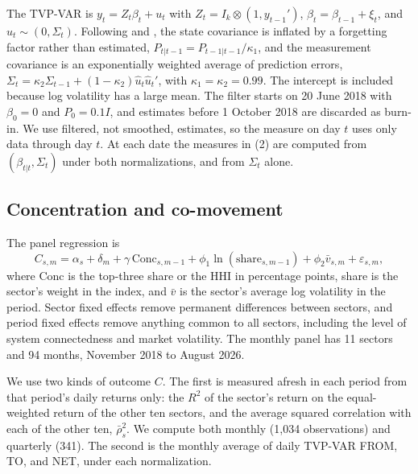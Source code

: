 \documentclass[11pt]{article}
\begin{document}
The TVP-VAR is $y_t = Z_t\beta_t + u_t$ with $Z_t = I_k\otimes(1, y_{t-1}')$, $\beta_t = \beta_{t-1}+\xi_t$, and $u_t\sim(0,\Sigma_t)$. Following \citet{koop2013} and \citet{antonakakis2020}, the state covariance is inflated by a forgetting factor rather than estimated, $P_{t|t-1} = P_{t-1|t-1}/\kappa_1$, and the measurement covariance is an exponentially weighted average of prediction errors, $\Sigma_t = \kappa_2\Sigma_{t-1}+(1-\kappa_2)\hat u_t\hat u_t'$, with $\kappa_1=\kappa_2=0.99$. The intercept is included because log volatility has a large mean. The filter starts on 20 June 2018 with $\beta_0=0$ and $P_0 = 0.1I$, and estimates before 1 October 2018 are discarded as burn-in. We use filtered, not smoothed, estimates, so the measure on day $t$ uses only data through day $t$. At each date the measures in (2) are computed from $(\beta_{t|t},\Sigma_t)$ under both normalizations, and from $\Sigma_t$ alone.

\subsection{Concentration and co-movement}

The panel regression is
\begin{equation}
C_{s,m} = \alpha_s + \delta_m + \gamma\,\text{Conc}_{s,m-1} + \phi_1\ln(\text{share}_{s,m-1}) + \phi_2 \bar v_{s,m} + \varepsilon_{s,m},
\end{equation}
where Conc is the top-three share or the HHI in percentage points, share is the sector's weight in the index, and $\bar v$ is the sector's average log volatility in the period. Sector fixed effects remove permanent differences between sectors, and period fixed effects remove anything common to all sectors, including the level of system connectedness and market volatility. The monthly panel has 11 sectors and 94 months, November 2018 to August 2026.

We use two kinds of outcome $C$. The first is measured afresh in each period from that period's daily returns only: the $R^2$ of the sector's return on the equal-weighted return of the other ten sectors, and the average squared correlation with each of the other ten, $\bar\rho^2_s$. We compute both monthly (1,034 observations) and quarterly (341). The second is the monthly average of daily TVP-VAR FROM, TO, and NET, under each normalization.
\end{document}
